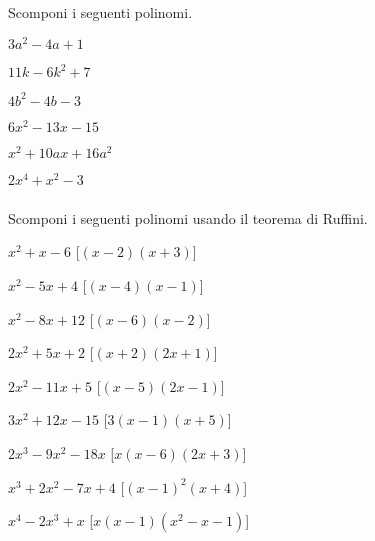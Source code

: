 \begin{esercizio}
 \label{ese:17.10}
 Scomponi i seguenti polinomi.
\begin{multicols}{3}
 \begin{enumeratea}
 \item $3a^{{2}}-4a+1$
 \item $11k-6k^{2}+7$
 \item $4b^{{2}}-4b-3$
 \item $6x^{2}-13x-15$
 \item $x^{2}+10ax+16a^{2}$
 \item $2x^{{4}}+x^{{2}}-3$
 \end{enumeratea}
\end{multicols}
 \end{esercizio}

\subsubsection*{}

\begin{esercizio}\label{ese:}
 Scomponi i seguenti polinomi usando il teorema di Ruffini.
\begin{multicols}{2}
 \begin{enumeratea}
\item \(x^{2} + x - 6\)
  \hfill [\(\left(x - 2\right) \left(x + 3\right)\)]
\item \(x^{2} - 5 x + 4\)
  \hfill [\(\left(x - 4\right) \left(x - 1\right)\)]
\item \(x^{2} - 8 x + 12\)
  \hfill [\(\left(x - 6\right) \left(x - 2\right)\)]
\item \(2 x^{2} + 5 x + 2\)
  \hfill [\(\left(x + 2\right) \left(2 x + 1\right)\)]
\item \(2 x^{2} - 11 x + 5\)
  \hfill [\(\left(x - 5\right) \left(2 x - 1\right)\)]
\item \(3 x^{2} + 12 x - 15\)
  \hfill [\(3 \left(x - 1\right) \left(x + 5\right)\)]
\item \(2 x^{3} - 9 x^{2} - 18 x\)
  \hfill [\(x \left(x - 6\right) \left(2 x + 3\right)\)]
\item \(x^{3} + 2 x^{2} - 7 x + 4\)
  \hfill [\(\left(x - 1\right)^{2} \left(x + 4\right)\)]
\item \(x^{4} - 2 x^{3} + x\)
  \hfill [\(x \left(x - 1\right) \left(x^{2} - x - 1\right)\)]
 \end{enumeratea}
\end{multicols}
\end{esercizio}

